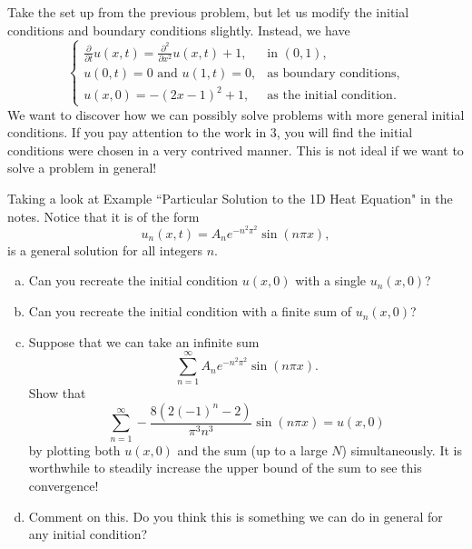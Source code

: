 \documentclass[12pt]{article} %
\begin{document}
\begin{problem}[Bonus]
Take the set up from the previous problem, but let us modify the initial conditions and boundary conditions slightly. Instead, we have
\[
\begin{cases}
\frac{\partial}{\partial t} u(x,t) = \frac{\partial^2}{\partial x^2} u(x,t) + 1, & \textrm{in $(0,1)$},\\
u(0,t)=0 \textrm{~and~} u(1,t)=0, & \text{as boundary conditions},\\
u(x,0) = -(2x-1)^2+1, & \textrm{as the initial condition}.
\end{cases}
\]
We want to discover how we can possibly solve problems with more general initial conditions. If you pay attention to the work in 3, you will find the initial conditions were chosen in a very contrived manner. This is not ideal if we want to solve a problem in general!

Taking a look at Example ``Particular Solution to the 1D Heat Equation" in the notes. Notice that it is of the form
\[
u_n(x,t) = A_ne^{-n^2\pi^2} \sin(n \pi x),
\]
is a general solution for all integers $n$. 
\begin{enumerate}[(a)]
    \item Can you recreate the initial condition $u(x,0)$ with a single $u_n(x,0)$?
    \item Can you recreate the initial condition with a finite sum of $u_n(x,0)$?
    \item Suppose that we can take an infinite sum
    \[
    \sum_{n=1}^\infty A_n e^{-n^2\pi^2} \sin(n \pi x).
    \]
    Show that
    \[
    \sum_{n=1}^\infty -\frac{8\left(2\left(-1\right)^{n}-2\right)}{\pi^{3}n^{3}}\sin\left(n\pi x\right) = u(x,0)
    \]
    by plotting both $u(x,0)$ and the sum (up to a large $N$) simultaneously. It is worthwhile to steadily increase the upper bound of the sum to see this convergence!
    \item Comment on this. Do you think this is something we can do in general for any initial condition?
\end{enumerate}
\end{problem}
\end{document}
